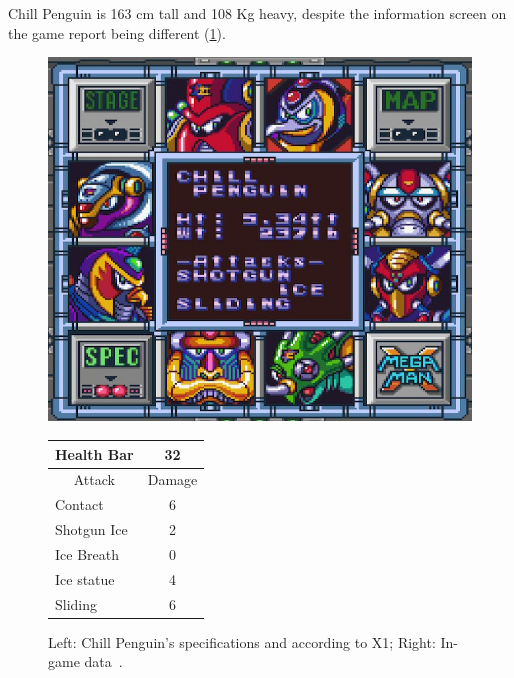 Chill Penguin is 163 cm tall and 108 Kg heavy, despite the information screen on the game report being different (\ref{Penguin_specs}).

\begin{figure}[htp]
	\begin{minipage}[c]{0.45\linewidth}
		\vspace{0pt}
		\centering
		\includegraphics[width=\linewidth]{figures/X1/Chill_penguin/Chill_penguin_specs.jpg}
	\end{minipage}
	\begin{minipage}[c]{0.45\linewidth}
		\centering
		\vspace{0pt}
		\begin{tabular}[h]{l c}
			\toprule
			Health Bar & 32\\
			\midrule
			\multicolumn{1}{c}{Attack} & \multicolumn{1}{c}{Damage}\\
			Contact & 6\\
			Shotgun Ice & 2\\
			Ice Breath & 0\\
			Ice statue & 4\\
			Sliding & 6\\
			\bottomrule
		\end{tabular}
	\end{minipage}
	\caption{Left: Chill Penguin's specifications and according to X1; Right: In-game data~\cite{wiki:Chill_Penguin}. }
	\label{Penguin_specs}
\end{figure}


